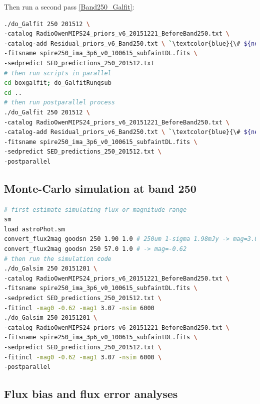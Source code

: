 \documentclass[11pt,a4paper]{article}
\begin{document}
Then run a second pass \ref{Band250_Galfit}: 

\begin{lstlisting}[language=bash]
./do_Galfit 250 201512 \
-catalog RadioOwenMIPS24_priors_v6_20151221_BeforeBand250.txt \
-catalog-add Residual_priors_v6_Band250.txt \ `\textcolor{blue}{\# ${new!}$}`
-fitsname spire250_ima_3p6_v0_100615_subfaintDL.fits \
-sedpredict SED_predictions_250_201512.txt
# then run scripts in parallel 
cd boxgalfit; do_GalfitRunqsub
cd ..
# then run postparallel process
./do_Galfit 250 201512 \
-catalog RadioOwenMIPS24_priors_v6_20151221_BeforeBand250.txt \
-catalog-add Residual_priors_v6_Band250.txt \ `\textcolor{blue}{\# ${new!}$}`
-fitsname spire250_ima_3p6_v0_100615_subfaintDL.fits \
-sedpredict SED_predictions_250_201512.txt \
-postparallel
\end{lstlisting}

\subsection{Monte-Carlo simulation at band 250}
\label{Band250_Galsim}

\begin{lstlisting}[language=bash]
# first estimate simulating flux or magnitude range
sm
load astroPhot.sm 
convert_flux2mag goodsn 250 1.90 1.0 # 250um 1-sigma 1.98mJy -> mag=3.069
convert_flux2mag goodsn 250 57.0 1.0 # -> mag=-0.62
# then run the simulation code
./do_Galsim 250 20151201 \
-catalog RadioOwenMIPS24_priors_v6_20151221_BeforeBand250.txt \
-fitsname spire250_ima_3p6_v0_100615_subfaintDL.fits \
-sedpredict SED_predictions_250_201512.txt \
-fitincl -mag0 -0.62 -mag1 3.07 -nsim 6000 
./do_Galsim 250 20151201 \
-catalog RadioOwenMIPS24_priors_v6_20151221_BeforeBand250.txt \
-fitsname spire250_ima_3p6_v0_100615_subfaintDL.fits \
-sedpredict SED_predictions_250_201512.txt \
-fitincl -mag0 -0.62 -mag1 3.07 -nsim 6000 \
-postparallel
\end{lstlisting}


\subsection{Flux bias and flux error analyses}
\label{Band250_simanalyses}
\end{document}
